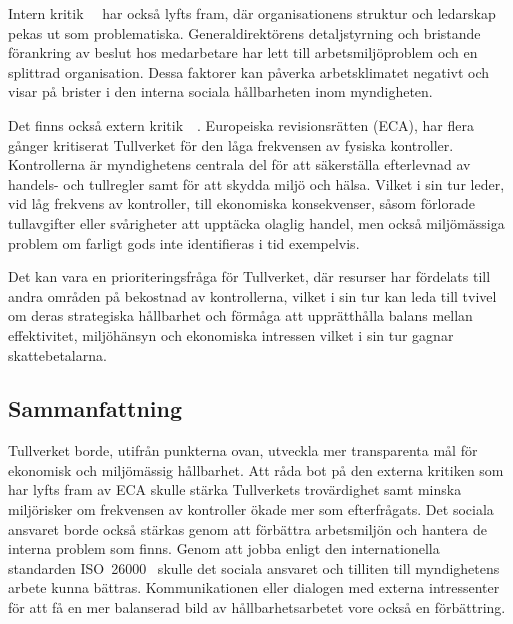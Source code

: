 Intern kritik~\cite{ex-uppror}~\cite{svd-kritik} har också lyfts fram, där
organisationens struktur och ledarskap pekas ut som problematiska.
Generaldirektörens detaljstyrning och bristande förankring av beslut hos
medarbetare har lett till arbetsmiljöproblem och en splittrad organisation.
Dessa faktorer kan påverka arbetsklimatet negativt och visar på brister i den
interna sociala hållbarheten inom myndigheten.

Det finns också extern kritik~\cite{eu-riksdagen}~\cite{eu-portalen}.
Europeiska revisionsrätten (ECA), har flera gånger kritiserat Tullverket för
den låga frekvensen av fysiska kontroller. Kontrollerna är myndighetens
centrala del för att säkerställa efterlevnad av handels- och tullregler samt
för att skydda miljö och hälsa. Vilket i sin tur leder, vid låg frekvens av
kontroller, till ekonomiska konsekvenser, såsom förlorade tullavgifter eller
svårigheter att upptäcka olaglig handel, men också miljömässiga problem om
farligt gods inte identifieras i tid exempelvis.

Det kan vara en prioriteringsfråga för Tullverket, där resurser har fördelats
till andra områden på bekostnad av kontrollerna, vilket i sin tur kan leda till
tvivel om deras strategiska hållbarhet och förmåga att upprätthålla balans
mellan effektivitet, miljöhänsyn och ekonomiska intressen vilket i sin tur
gagnar skattebetalarna.

\subsection{Sammanfattning}

Tullverket borde, utifrån punkterna ovan, utveckla mer transparenta mål för
ekonomisk och miljömässig hållbarhet. Att råda bot på den externa kritiken
som har lyfts fram av ECA skulle stärka Tullverkets trovärdighet samt minska
miljörisker om frekvensen av kontroller ökade mer som efterfrågats. Det sociala
ansvaret borde också stärkas genom att förbättra arbetsmiljön och hantera de
interna problem som finns. Genom att jobba enligt den internationella
standarden ISO~26000~\cite{iso26000} skulle det sociala ansvaret och tilliten
till myndighetens arbete kunna bättras. Kommunikationen eller dialogen med
externa intressenter för att få en mer balanserad bild av hållbarhetsarbetet
vore också en förbättring.
